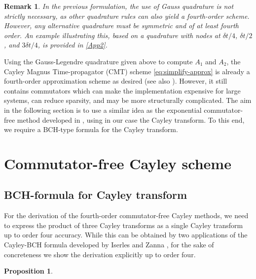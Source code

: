\documentclass{article}
\newtheorem{proposition}{Proposition}[section]
\newtheorem{remark}{Remark}
\begin{document}
{\begin{remark}
\label{remark:quadrature}
In the previous formulation, the use of Gauss quadrature is not strictly necessary, as other quadrature rules can also yield a fourth-order scheme. However, any alternative quadrature must be symmetric and of at least fourth order. An example illustrating this, based on a quadrature with nodes at $\delta t/4$, $\delta t/2$, and $3\delta t/4$, is provided in \ref{App2}.  
\end{remark}

Using the Gauss-Legendre quadrature given above to compute $A_1$ and $A_2$, the Cayley Magnus Time-propagator (CMT) scheme \eqref{eq:simplify-approx} is already a fourth-order approximation scheme as desired (see also  \cite{Iserles:2001}). However, it still contains commutators which can make the implementation expensive for large systems, can reduce sparsity, and may be more structurally complicated. The aim in the following section is to use a similar idea as the exponential commutator-free method developed in \cite{AF:2011}, using in our case the Cayley transform. To this end, we require a BCH-type formula for the Cayley transform.


\section{Commutator-free Cayley scheme}
\label{sec:Cayley-commutator-free}


\subsection{BCH-formula for Cayley transform}

For the derivation of the fourth-order commutator-free Cayley methods, we need to express the product of three Cayley transforms as a single Cayley transform up to order four accuracy. While this can be obtained by two applications of the Cayley-BCH formula developed by Iserles and Zanna \cite{IZ:2000}, for the sake of concreteness we show the derivation explicitly up to order four. 

%
\begin{proposition}
\label{prop:Cayley-BCH}


\end{proposition}}
\end{document}
